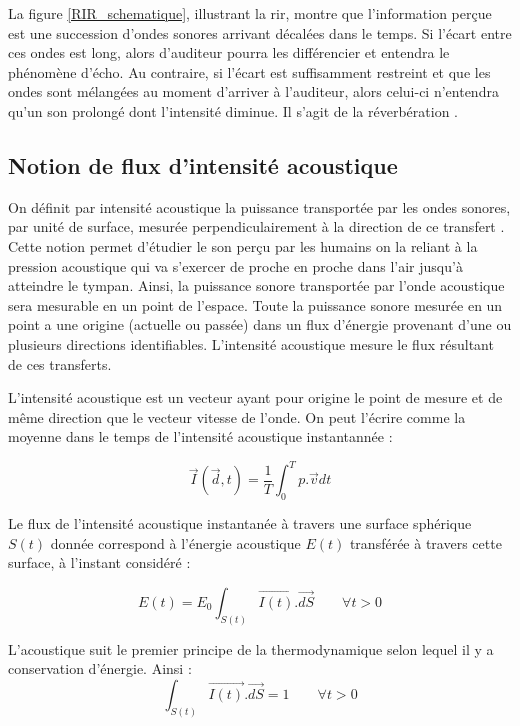 La figure \ref{RIR_schematique}, illustrant la \gls{rir}, montre que l'information perçue est une succession d'ondes sonores arrivant décalées dans le temps. Si l'écart entre ces ondes est long, alors d'auditeur pourra les différencier et entendra le phénomène d'écho. Au contraire, si l'écart est suffisamment restreint et que les ondes sont mélangées au moment d'arriver à l'auditeur, alors celui-ci n'entendra qu'un son prolongé dont l'intensité diminue. Il s'agit de la réverbération \cite[p. 39]{sabine}. 





\subsection{Notion de flux d'intensité acoustique} \label{sect_intensite}
On définit par intensité acoustique la puissance transportée par les ondes sonores, par unité de surface, mesurée perpendiculairement à la direction de ce transfert \cite[IEC 60050]{cei}. Cette notion permet d'étudier le son perçu par les humains on la reliant à la pression acoustique qui va s'exercer de proche en proche dans l'air jusqu'à atteindre le tympan. Ainsi, la puissance sonore transportée par l'onde acoustique sera mesurable en un point de l'espace. Toute la puissance sonore mesurée en un point a une origine (actuelle ou passée) dans un flux d'énergie provenant d'une ou plusieurs directions identifiables. L'intensité acoustique mesure le flux résultant de ces transferts. 

L'intensité acoustique est un vecteur ayant pour origine le point de mesure et de même direction que le vecteur vitesse de l'onde. On peut l'écrire comme la moyenne dans le temps de l'intensité acoustique instantannée :

\begin{equation} 
\overrightarrow{I}(\overrightarrow{d},t) = \frac{1}{T} \int^T_0 p.\overrightarrow{v}dt
\end{equation}

Le flux de l'intensité acoustique instantanée à travers une surface sphérique $S(t)$ donnée correspond à l'énergie acoustique $E(t)$ transférée à travers cette surface, à l'instant considéré :

\begin{equation} 
E(t) = E_0 \int_{S(t)} \overrightarrow{I(t)}.\overrightarrow{dS} \qquad \forall t > 0
\end{equation}

L'acoustique suit le premier principe de la thermodynamique selon lequel il y a conservation d'énergie. Ainsi : 
\begin{equation} 
\int_{S(t)} \overrightarrow{I(t)}.\overrightarrow{dS} = 1 \qquad \forall t > 0
\end{equation}

